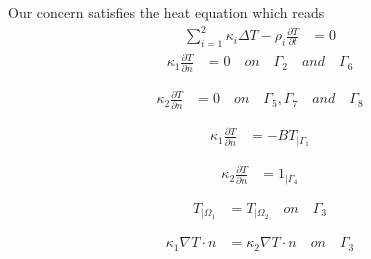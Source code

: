 Our concern satisfies the heat equation which reads 
\begin{equation}
\label{heat:eq}
   \begin{split}
      \displaystyle{\sum_{i=1}^{2} \kappa_i \Delta T - \rho_i \frac{ \partial T}{\partial t}}  & = 0
  \end{split}
\end{equation}
\begin{equation}
\label{hom_neu1}
   \begin{split}
      \displaystyle{ \kappa_1 \frac{\partial T}{\partial n}} & =  0 \quad on \quad \Gamma_2 \quad and \quad \Gamma_6 \\ \\ 
  \end{split}
\end{equation}
\begin{equation}
\label{hom_neu2}
   \begin{split}
      \displaystyle{ \kappa_2 \frac{\partial T}{\partial n}} & =  0 \quad on \quad \Gamma_5 , \Gamma_7 \quad and \quad \Gamma_8 \\ \\ 
  \end{split}
\end{equation}
\begin{equation}
\label{classic_neu}
   \begin{split}
      \displaystyle{ \kappa_1 \frac{\partial T}{\partial n}} & = - B T_{ | \Gamma_1 } \\ \\
  \end{split}
\end{equation}
\begin{equation}
\label{nonhom_neu}
   \begin{split}
      \displaystyle{ \kappa_2 \frac{\partial T}{\partial n}} & =  1_{| \Gamma_4} \\ \\
  \end{split}
\end{equation}
\begin{equation}
\label{temp_conti}
   \begin{split}
      T_{| \varOmega_1} & = T_{| \varOmega_2} \quad on \quad \Gamma_3 \\ \\
  \end{split}
\end{equation}
\begin{equation}
\label{flux_conti}
   \begin{split}
      \displaystyle{ \kappa_1 \nabla T \cdot n} & = \displaystyle{ \kappa_2 \nabla T \cdot n \quad on \quad \Gamma_3} \\ \\
  \end{split}
\end{equation}

